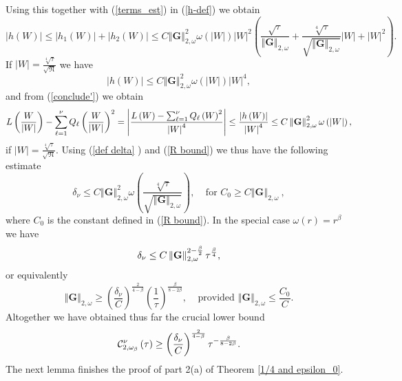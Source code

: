 \documentclass{amsart}
\theoremstyle{plain}
\numberwithin{equation}{section}
\begin{document}
Using this together with (\ref{terms_est}) in (\ref{h-def}) we obtain 
\begin{equation*}
\left\vert h\left( W\right) \right\vert \leq \left\vert h_{1}\left( W\right)
\right\vert +\left\vert h_{2}\left( W\right) \right\vert \leq C\left\Vert 
\mathbf{G}\right\Vert _{2,\omega }^{2}\omega \left( \left\vert W\right\vert
\right) \left\vert W\right\vert ^{2}\left( \frac{\sqrt{\tau }}{\left\Vert 
\mathbf{G}\right\Vert _{2,\omega }}+\frac{\sqrt[4]{\tau }}{\sqrt{\left\Vert 
\mathbf{G}\right\Vert _{2,\omega }}}|W|+\left\vert W\right\vert ^{2}\right) .
\end{equation*}%
If $|W|=\frac{\sqrt[4]{\tau }}{\sqrt{\mathfrak{N}}}$ we have 
\begin{equation*}
\left\vert h\left( W\right) \right\vert \leq C\left\Vert \mathbf{G}%
\right\Vert _{2,\omega }^{2}\omega \left( \left\vert W\right\vert \right)
\left\vert W\right\vert ^{4},
\end{equation*}%
and from (\ref{conclude'}) we obtain 
\begin{equation*}
L\left( \frac{W}{\left\vert W\right\vert }\right) -\sum_{\ell =1}^{\nu
}Q_{\ell }\left( \frac{W}{\left\vert W\right\vert }\right) ^{2}=\left\vert 
\frac{L\left( W\right) -\sum_{\ell =1}^{\nu }Q_{\ell }\left( W\right) ^{2}}{%
\left\vert W\right\vert ^{4}}\right\vert \leq \frac{\left\vert h\left(
W\right) \right\vert }{\left\vert W\right\vert ^{4}}\leq C\left\Vert \mathbf{%
G}\right\Vert _{2,\omega }^{2}\omega \left( \left\vert W\right\vert \right) ,
\end{equation*}%
if $|W|=\frac{\sqrt[4]{\tau }}{\sqrt{\mathfrak{N}}}$. Using (\ref{def delta}%
) and (\ref{R bound}) we thus have the following estimate 
\begin{equation*}
\delta _{\nu }\leq C\left\Vert \mathbf{G}\right\Vert _{2,\omega }^{2}\omega
\left( \frac{\sqrt[4]{\tau }}{\sqrt{\left\Vert \mathbf{G}\right\Vert
_{2,\omega }}}\right) ,\ \ \ \ \ \text{for }C_{0}\geq C\left\Vert \mathbf{G}%
\right\Vert _{2,\omega }\ ,
\end{equation*}%
where $C_{0}$ is the constant defined in (\ref{R bound}). In the special
case $\omega (r)=r^{\beta }$ we have 
\begin{equation*}
\delta _{\nu }\leq C\left\Vert \mathbf{G}\right\Vert _{2,\omega }^{2-\frac{%
\beta }{2}}\tau ^{\frac{\beta }{4}},
\end{equation*}%
or equivalently 
\begin{equation*}
\left\Vert \mathbf{G}\right\Vert _{2,\omega }\geq \left( \frac{\delta _{\nu }%
}{C}\right) ^{\frac{2}{4-\beta }}\left( \frac{1}{\tau }\right) ^{\frac{\beta 
}{8-2\beta }},\ \ \ \ \ \text{provided }\left\Vert \mathbf{G}\right\Vert
_{2,\omega }\leq \frac{C_{0}}{C}.
\end{equation*}%
Altogether we have obtained thus far the crucial lower bound%
\begin{equation}
\mathcal{C}_{2,\omega _{\beta }}^{\nu }\left( \tau \right) \geq \left( \frac{%
\delta _{\nu }}{C}\right) ^{\frac{2}{4-\beta }}\tau ^{-\frac{\beta }{%
8-2\beta }}.  \label{crucial low}
\end{equation}%
The next lemma finishes the proof of part 2(a) of Theorem \ref{1/4 and
epsilon_0}.
\end{document}
